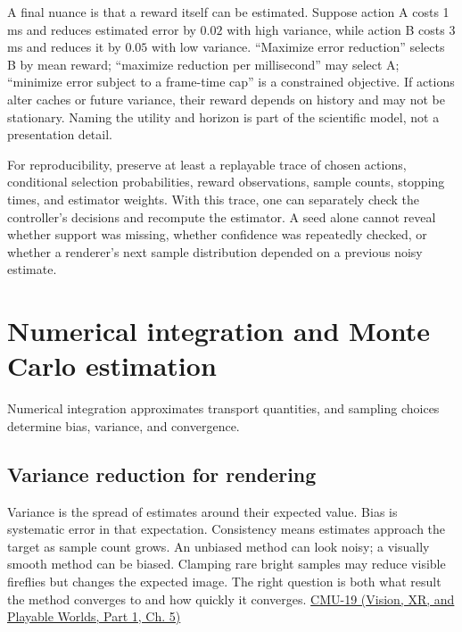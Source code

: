 A final nuance is that a reward itself can be estimated. Suppose action A costs 1 ms and reduces estimated error by \(0.02\) with high variance, while action B costs 3 ms and reduces it by \(0.05\) with low variance. ``Maximize error reduction'' selects B by mean reward; ``maximize reduction per millisecond'' may select A; ``minimize error subject to a frame-time cap'' is a constrained objective. If actions alter caches or future variance, their reward depends on history and may not be stationary. Naming the utility and horizon is part of the scientific model, not a presentation detail.

For reproducibility, preserve at least a replayable trace of chosen actions, conditional selection probabilities, reward observations, sample counts, stopping times, and estimator weights. With this trace, one can separately check the controller's decisions and recompute the estimator. A seed alone cannot reveal whether support was missing, whether confidence was repeatedly checked, or whether a renderer's next sample distribution depended on a previous noisy estimate.

\section{Numerical integration and Monte Carlo estimation}\label{03-visual-computing-i-ch012-numerical-integration-and-monte-carlo-estimation}

\hypertarget{03-visual-computing-i-ch012-numerical-integration-and-monte-carlo-estimation}{}

Numerical integration approximates transport quantities, and sampling choices determine bias, variance, and convergence.

\subsection{Variance reduction for rendering}\label{03-visual-computing-i-ch012-variance-reduction-for-rendering}

\hypertarget{03-visual-computing-i-ch012-variance-reduction-for-rendering}{}

Variance is the spread of estimates around their expected value. Bias is systematic error in that expectation. Consistency means estimates approach the target as sample count grows. An unbiased method can look noisy; a visually smooth method can be biased. Clamping rare bright samples may reduce visible fireflies but changes the expected image. The right question is both what result the method converges to and how quickly it converges. \href{../07-Vision-XR-and-Playable-Worlds-P01/main.pdf\#nameddest=04-visual-computing-ii-ch036-cmu-19---variance-reduction}{CMU-19 (Vision, XR, and Playable Worlds, Part 1, Ch. 5)}

